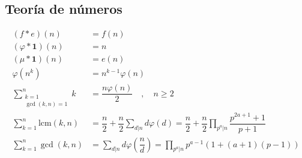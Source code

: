 	\subsection{Teoría de números}
		\begin{align*}
			(f * e)(n) &= f(n) \\
			(\varphi * \mathbf{1})(n) &= n \\
			(\mu * \mathbf{1})(n) &= e(n) \\
			\varphi(n^k) &= n^{k-1}\varphi(n) \\
			\sum_{\substack{k=1	\\ \gcd(k,n)=1}}^{n} k &= \dfrac{n \varphi(n)}{2} \quad , \quad n \geq 2 \\
			\sum_{k=1}^{n} \text{lcm}(k,n) &= \dfrac{n}{2} + \dfrac{n}{2}\sum_{d | n} d\varphi(d) = \dfrac{n}{2} + \dfrac{n}{2} \prod_{p^a | n} \dfrac{p^{2a+1}+1}{p+1} \\
			\sum_{k=1}^{n} \gcd(k,n) &= \sum_{d | n} d\varphi\left(\dfrac{n}{d}\right) = \prod_{p^a | n} p^{a-1}(1+(a+1)(p-1))
		\end{align*}
	

